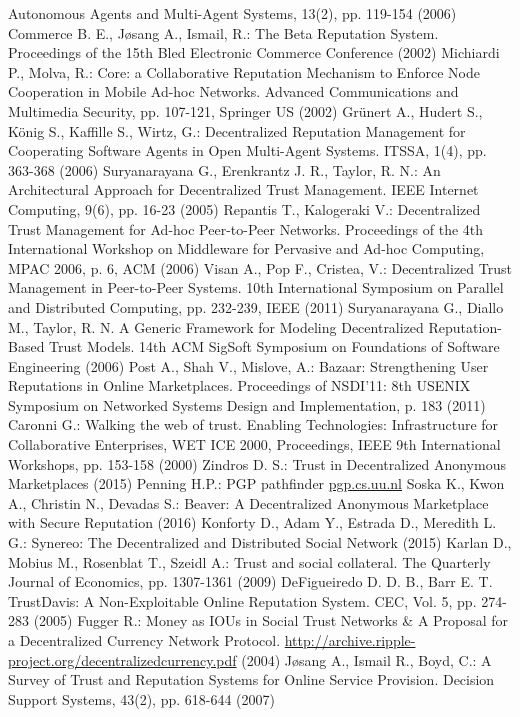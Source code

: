 \documentclass[11pt]{llncs}
\theoremstyle{definition}
\begin{document}
\begin{thebibliography}{40}
     Autonomous Agents and Multi-Agent Systems, 13(2), pp. 119-154 (2006)
     Commerce B. E., Jøsang A., Ismail, R.: The Beta Reputation System. Proceedings of the 15th Bled Electronic Commerce
     Conference (2002)
     Michiardi P., Molva, R.: Core: a Collaborative Reputation Mechanism to Enforce Node Cooperation in Mobile Ad-hoc
     Networks. Advanced Communications and Multimedia Security, pp. 107-121, Springer US (2002)
     Grünert A., Hudert S., König S., Kaffille S., Wirtz, G.: Decentralized Reputation Management for Cooperating Software
     Agents in Open Multi-Agent Systems. ITSSA, 1(4), pp. 363-368 (2006)
     Suryanarayana G., Erenkrantz J. R., Taylor, R. N.: An Architectural Approach for Decentralized Trust Management. IEEE
     Internet Computing, 9(6), pp. 16-23 (2005)
     Repantis T., Kalogeraki V.: Decentralized Trust Management for Ad-hoc Peer-to-Peer Networks. Proceedings of the 4th
     International Workshop on Middleware for Pervasive and Ad-hoc Computing, MPAC 2006, p. 6, ACM (2006)
     Visan A., Pop F., Cristea, V.: Decentralized Trust Management in Peer-to-Peer Systems. 10th International Symposium on
     Parallel and Distributed Computing, pp. 232-239, IEEE (2011)
     Suryanarayana G., Diallo M., Taylor, R. N. A Generic Framework for Modeling Decentralized Reputation-Based Trust Models.
     14th ACM SigSoft Symposium on Foundations of Software Engineering (2006)
     Post A., Shah V., Mislove, A.: Bazaar: Strengthening User Reputations in Online Marketplaces. Proceedings of NSDI’11:
     8th USENIX Symposium on Networked Systems Design and Implementation, p. 183 (2011)
     Caronni G.: Walking the web of trust. Enabling Technologies: Infrastructure for Collaborative Enterprises, WET ICE 2000,
     Proceedings, IEEE 9th International Workshops, pp. 153-158 (2000)
     Zindros D. S.: Trust in Decentralized Anonymous Marketplaces (2015)
     Penning H.P.: PGP pathfinder \url{pgp.cs.uu.nl}
     Soska K., Kwon A., Christin N., Devadas S.: Beaver: A Decentralized Anonymous Marketplace with Secure Reputation (2016)
     Konforty D., Adam Y., Estrada D., Meredith L. G.: Synereo: The Decentralized and Distributed Social Network (2015)
     Karlan D., Mobius M., Rosenblat T., Szeidl A.: Trust and social collateral. The Quarterly Journal of Economics, pp.
     1307-1361 (2009)
     DeFigueiredo D. D. B., Barr E. T. TrustDavis: A Non-Exploitable Online Reputation System. CEC, Vol. 5, pp. 274-283
     (2005)
     Fugger R.: Money as IOUs in Social Trust Networks \& A Proposal for a Decentralized Currency Network Protocol.
     \url{http://archive.ripple-project.org/decentralizedcurrency.pdf} (2004)
     Jøsang A., Ismail R., Boyd, C.: A Survey of Trust and Reputation Systems for Online Service Provision. Decision
     Support Systems, 43(2), pp. 618-644 (2007)
  \end{thebibliography}
\end{document}
